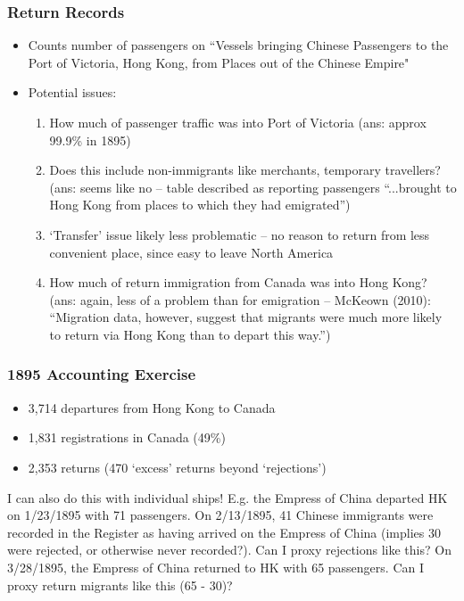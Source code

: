 \documentclass[pdf]{beamer}
\begin{document}
\begin{frame}[label = return]
    \frametitle{Return Records}
    \begin{itemize}
        \item Counts number of passengers on ``Vessels bringing Chinese Passengers to the Port of Victoria, Hong Kong, from Places out of the Chinese Empire" \hyperlink{hk_return}{}
        \item Potential issues: 
        \begin{enumerate}
            \item How much of passenger traffic was into Port of Victoria (ans: approx 99.9\% in 1895)
            \item Does this include non-immigrants like merchants, temporary travellers? (ans: seems like no -- table described as reporting passengers ``...brought to Hong Kong from places to which they had emigrated'')
            \item `Transfer' issue likely less problematic -- no reason to return from less convenient place, since easy to leave North America 
            \item How much of return immigration from Canada was into Hong Kong? (ans: again, less of a problem than for emigration -- McKeown (2010): ``Migration data, however, suggest that migrants were much more likely to return via Hong Kong than to depart this way.'')
        \end{enumerate}
    \end{itemize}
\end{frame}

\begin{frame}
    \frametitle{1895 Accounting Exercise}
    \begin{itemize}
        \item 3,714 departures from Hong Kong to Canada 
        \item 1,831 registrations in Canada (49\%)
        \item 2,353 returns (470 `excess' returns beyond `rejections')
    \end{itemize}
    I can also do this with individual ships! E.g. the Empress of China departed HK on 1/23/1895 with 71 passengers. On 2/13/1895, 41 Chinese immigrants were recorded in the Register as having arrived on the Empress of China (implies 30 were rejected, or otherwise never recorded?). Can I proxy rejections like this? On 3/28/1895, the Empress of China returned to HK with 65 passengers. Can I proxy return migrants like this (65 - 30)? 
\end{frame}
\end{document}
